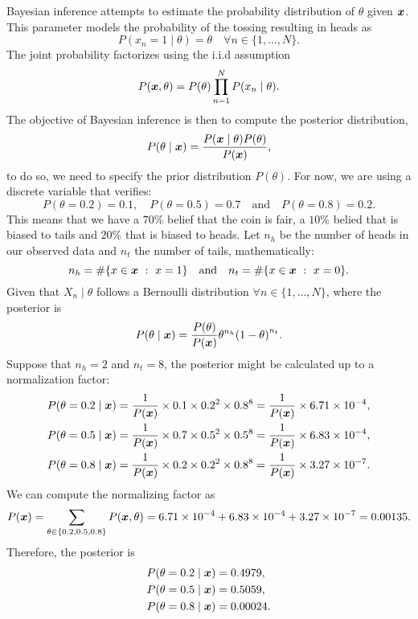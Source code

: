 Bayesian inference attempts to estimate the probability distribution of \(\theta\) given \(\bm{x}\). This parameter models the probability of the tossing resulting in heads as
\[
P(x_n = 1  \mid  \theta) = \theta \quad \forall n \in \{1,\dots,N\}.
\]
The joint probability factorizes using the i.i.d assumption
\[
  P(\bm{x},\theta) = P(\theta)\prod_{n=1}^N P(x_n \mid \theta).
\]
The objective of Bayesian inference is then to compute the posterior distribution,
\[
  P(\theta \mid \bm{x}) = \frac{P(\bm{x} \mid \theta)P(\theta)}{P(\bm{x})},
\]
to do so, we need to specify the prior distribution \(P(\theta)\). For now, we are using a discrete variable that verifies:
\[
  P(\theta = 0.2) = 0.1, \quad P(\theta = 0.5) = 0.7 \quad \text{and} \quad P(\theta = 0.8) = 0.2.
\]
This means that we have a \(70\%\) belief that the coin is fair, a \(10\%\)
belied that is biased to tails and \(20\%\) that is biased to heads. Let \(n_h\) be the number of heads in our observed data and \(n_t\)
the number of tails, mathematically:
\[
  n_{h} = \#\{x \in \bm{x} \ : \ x = 1\} \quad \text{and} \quad n_{t} = \#\{x \in \bm{x} \ : \ x = 0\}.
\]
Given that \(X_{n} \mid \theta\) follows a Bernoulli distribution \(\forall n \in \{1,\dots,N\}\), where the posterior is
\[
  P(\theta  \mid \bm{x}) = \frac{P(\theta)}{P(\bm{x})} \theta^{n_h}{(1-\theta)}^{n_t}.
\]
Suppose that \(n_h = 2\) and \(n_t = 8\), the posterior might be calculated up to a normalization factor:
\[
\begin{aligned}
  P(\theta = 0.2  \mid  \bm{x}) &= \frac{1}{P(\bm{x})}\times 0.1 \times 0.2^{2}
  \times 0.8^{8} = \frac{1}{P(\bm{x})} \times 6.71\times10^{-4}, \\
   P(\theta = 0.5  \mid  \bm{x}) &= \frac{1}{P(\bm{x})}\times 0.7 \times 0.5^{2}
   \times 0.5^{8} = \frac{1}{P(\bm{x})} \times 6.83\times10^{-4},\\
    P(\theta = 0.8  \mid  \bm{x}) &= \frac{1}{P(\bm{x})}\times 0.2 \times 0.2^{2}
  \times 0.8^{8} = \frac{1}{P(\bm{x})} \times 3.27\times10^{-7}.
\end{aligned}
\]
We can compute the normalizing factor as
\[
   P(\bm{x}) = \sum_{\theta \in \{0.2, 0.5, 0.8\}} P(\bm{x}, \theta) =   6.71\times10^{-4} +   6.83\times10^{-4} +
   3.27\times10^{-7} = 0.00135.
 \]
Therefore, the posterior is
\[
\begin{aligned}
  P(\theta = 0.2  \mid  \bm{x}) &= 0.4979,\\
  P(\theta = 0.5  \mid  \bm{x}) &= 0.5059,\\
  P(\theta = 0.8  \mid  \bm{x}) &= 0.00024.
\end{aligned}
\]

